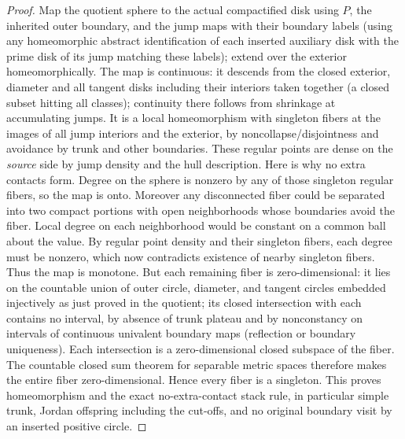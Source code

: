 \begin{proof}
Map the quotient sphere to the actual compactified disk using \(P\), the inherited outer boundary, and the jump maps with their boundary labels (using any homeomorphic abstract identification of each inserted auxiliary disk with the prime disk of its jump matching these labels); extend over the exterior homeomorphically.
The map is continuous: it descends from the closed exterior, diameter and all tangent disks including their interiors taken together (a closed subset hitting all classes); continuity there follows from shrinkage at accumulating jumps.
It is a local homeomorphism with singleton fibers at the images of all jump interiors and the exterior, by noncollapse/disjointness and avoidance by trunk and other boundaries.
These regular points are dense on the \emph{source} side by jump density and the hull description.
Here is why no extra contacts form.
Degree on the sphere is nonzero by any of those singleton regular fibers, so the map is onto.
Moreover any disconnected fiber could be separated into two compact portions with open neighborhoods whose boundaries avoid the fiber.
Local degree on each neighborhood would be constant on a common ball about the value.
By regular point density and their singleton fibers, each degree must be nonzero, which now contradicts existence of nearby singleton fibers.
Thus the map is monotone.
But each remaining fiber is zero-dimensional: it lies on the countable union of outer circle, diameter, and tangent circles embedded injectively as just proved in the quotient; its closed intersection with each contains no interval, by absence of trunk plateau and by nonconstancy on intervals of continuous univalent boundary maps (reflection or boundary uniqueness).
Each intersection is a zero-dimensional closed subspace of the fiber.  The countable closed sum theorem for separable metric spaces \citep[Theorem~1.3.1]{EngelkingDimension} therefore makes the entire fiber zero-dimensional.
Hence every fiber is a singleton.
This proves homeomorphism and the exact no-extra-contact stack rule, in particular simple trunk, Jordan offspring including the cut-offs, and no original boundary visit by an inserted positive circle.


\end{proof}

